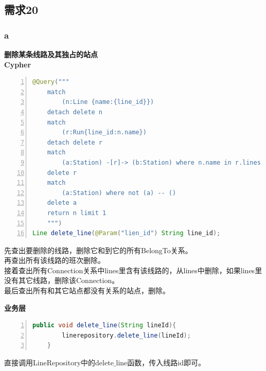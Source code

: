 \documentclass[11pt,a4paper]{article}
\begin{document}
\subsection{需求20}
\subsubsection{a}
\textbf{删除某条线路及其独占的站点} \\
\textbf{Cypher} \\
\begin{lstlisting}[numbers = left, 
showstringspaces=false,
showspaces = false,
breaklines = true, 
language=Java]
@Query("""
	match
		(n:Line {name:{line_id}})
	detach delete n
	match
		(r:Run{line_id:n.name})
	detach delete r
	match
		(a:Station) -[r]-> (b:Station) where n.name in r.lines and size(r.lines) = 1
	delete r
	match
		(a:Station) where not (a) -- ()
	delete a
	return n limit 1
	""")
Line delete_line(@Param("lien_id") String line_id);
\end{lstlisting} 
先查出要删除的线路，删除它和到它的所有BelongTo关系。 \\
再查出所有该线路的班次删除。 \\
接着查出所有Connection关系中lines里含有该线路的，从lines中删除，如果lines里没有其它线路，删除该Connection。\\
最后查出所有和其它站点都没有关系的站点，删除。

\textbf{业务层} \\
\begin{lstlisting}[numbers = left, 
showstringspaces=false,
showspaces = false,
breaklines = true, 
language=Java]
    public void delete_line(String lineId){
        linerepository.delete_line(lineId);
    }
\end{lstlisting} 
直接调用LineRepository中的delete$\_$line函数，传入线路id即可。
\end{document}
